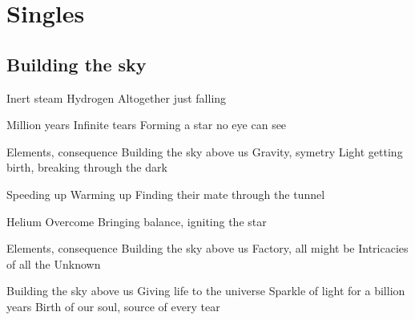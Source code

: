 \documentclass{article}
\newenvironment{album}[1]%
{%
  \section*{#1}
}%
{%
}
\newenvironment{song}[1]%
{%
  \subsection*{\textbf{#1}}
  \begin{multicols*}{2}
}%
{%
  \end{multicols*}
  \newpage
}
\newenvironment{couplet} %
{%
  \verbatim
}%
{% end code
  \endverbatim
}
\newenvironment{refrain} %
{%
  \verbatim
}%
{% end code
  \endverbatim
}
\begin{document}
\begin{album}{Singles}
\begin{song}{Building the sky}
\begin{couplet}
Inert steam
Hydrogen
Altogether just falling  
\end{couplet}
\begin{couplet}
Million years
Infinite tears
Forming a star no eye can see
\end{couplet}
\begin{refrain}
Elements, consequence
Building the sky above us
Gravity, symetry
Light getting birth, breaking through the dark
\end{refrain}
\begin{couplet}
Speeding up
Warming up
Finding their mate through the tunnel
\end{couplet}
\begin{couplet}
Helium
Overcome
Bringing balance, igniting the star
\end{couplet}
\begin{refrain}
Elements, consequence
Building the sky above us
Factory, all might be
Intricacies of all the Unknown
\end{refrain}
\begin{refrain}
Building the sky above us
Giving life to the universe
Sparkle of light for a billion years
Birth of our soul, source of every tear 
\end{refrain}
\end{song}


\end{album}
\end{document}
